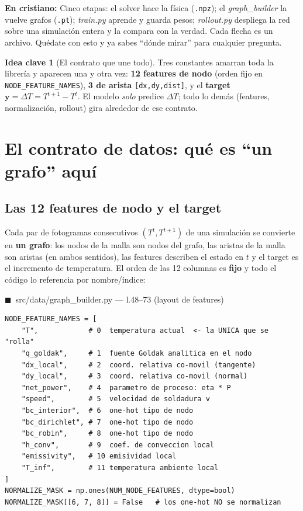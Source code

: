 \documentclass[11pt]{article}
\theoremstyle{definition}
\newtheorem{idea}{Idea clave}[section]
\theoremstyle{plain}
\newcommand{\dummies}[1]{%
  \par\smallskip\noindent
  \colorbox{yellow!18}{\parbox{\dimexpr\linewidth-2\fboxsep}{%
  \small\textbf{En cristiano:} #1}}\par\smallskip}
\newcommand{\srcref}[1]{\par\smallskip\noindent
  {\footnotesize\ttfamily\textcolor{srcblue}{$\blacksquare$\ #1}}\par\vspace{1pt}}
\begin{document}
\dummies{Cinco etapas: el solver hace la física (\texttt{.npz}); el
\emph{graph\_builder} la vuelve grafos (\texttt{.pt}); \emph{train.py} aprende y
guarda pesos; \emph{rollout.py} despliega la red sobre una simulación entera y la
compara con la verdad. Cada flecha es un archivo. Quédate con esto y ya sabes
``dónde mirar'' para cualquier pregunta.}

\begin{idea}[El contrato que une todo]
Tres constantes amarran toda la librería y aparecen una y otra vez:
\textbf{12 features de nodo} (orden fijo en \texttt{NODE\_FEATURE\_NAMES}),
\textbf{3 de arista} \texttt{[dx,dy,dist]}, y el \textbf{target} $\bm
y=\Delta T=T^{t+1}-T^{t}$. El modelo \emph{solo} predice $\Delta T$; todo lo demás
(features, normalización, rollout) gira alrededor de ese contrato.
\end{idea}

\section{El contrato de datos: qué es ``un grafo'' aquí}
\label{sec:datos}

\subsection{Las 12 features de nodo y el target}

Cada par de fotogramas consecutivos $(T^t,T^{t+1})$ de una simulación se convierte
en \textbf{un grafo}: los nodos de la malla son nodos del grafo, las aristas de la
malla son aristas (en ambos sentidos), las features describen el estado en $t$ y el
target es el incremento de temperatura. El orden de las 12 columnas es \textbf{fijo}
y todo el código lo referencia por nombre/índice:

\srcref{src/data/graph\_builder.py — l.48--73 (layout de features)}
\begin{lstlisting}
NODE_FEATURE_NAMES = [
    "T",            # 0  temperatura actual  <- la UNICA que se "rolla"
    "q_goldak",     # 1  fuente Goldak analitica en el nodo
    "dx_local",     # 2  coord. relativa co-movil (tangente)
    "dy_local",     # 3  coord. relativa co-movil (normal)
    "net_power",    # 4  parametro de proceso: eta * P
    "speed",        # 5  velocidad de soldadura v
    "bc_interior",  # 6  one-hot tipo de nodo
    "bc_dirichlet", # 7  one-hot tipo de nodo
    "bc_robin",     # 8  one-hot tipo de nodo
    "h_conv",       # 9  coef. de conveccion local
    "emissivity",   # 10 emisividad local
    "T_inf",        # 11 temperatura ambiente local
]
NORMALIZE_MASK = np.ones(NUM_NODE_FEATURES, dtype=bool)
NORMALIZE_MASK[[6, 7, 8]] = False   # los one-hot NO se normalizan
\end{lstlisting}
\end{document}
